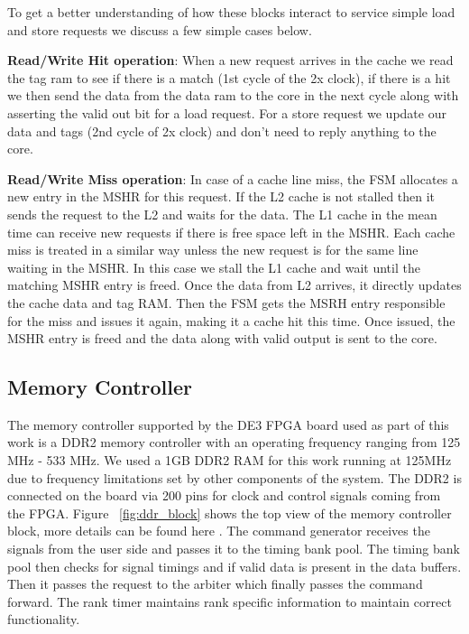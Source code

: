 To get a better understanding of how these blocks interact to service simple load and store requests we discuss a few simple cases below.

\textbf{Read/Write Hit operation}: When a new request arrives in the cache we read the tag ram to see if there is a match (1st cycle of the 2x clock), if there is a hit we then send the data from the data ram to the core in the next cycle along with asserting the valid out bit for a load request. For a store request we update our data and tags (2nd cycle of 2x clock) and don't need to reply anything to the core.

\textbf{Read/Write Miss operation}: In case of a cache line miss, the FSM allocates a new entry in the MSHR for this request. If the L2 cache is not stalled then it sends the request to the L2 and waits for the data. The L1 cache in the mean time can receive new requests if there is free space left in the MSHR. Each cache miss is treated in a similar way unless the new request is for the same line waiting in the MSHR. In this case we stall the L1 cache and wait until the matching MSHR entry is freed. Once the data from L2 arrives, it directly updates the cache data and tag RAM. Then the FSM gets the MSRH entry responsible for the miss and issues it again, making it a cache hit this time. Once issued, the MSHR entry is freed and the data along with valid output is sent to the core.
\subsection{Memory Controller}
The memory controller supported by the DE3 FPGA board used as part of this work is a DDR2 memory controller with an operating frequency ranging from 125 MHz - 533 MHz. We used a 1GB DDR2 RAM for this work running at 125MHz due to frequency limitations set by other components of the system. The DDR2 is connected on the board via 200 pins for clock and control signals coming from the FPGA. Figure ~\ref{fig:ddr_block} shows the top view of the memory controller block, more details can be found here \cite{ddr2}. The command generator receives the signals from the user side and passes it to the timing bank pool. The timing bank pool then checks for signal timings and if valid data is present in the data buffers. Then it passes the request to the arbiter which finally passes the command forward. The rank timer maintains rank specific information to maintain correct functionality.


